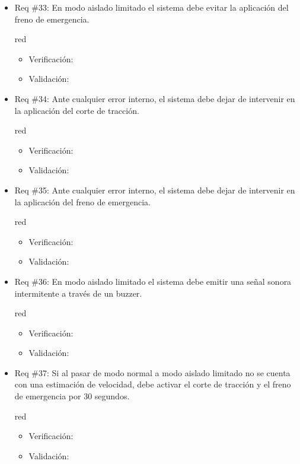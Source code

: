 \documentclass[11pt]{charter}
\begin{document}
\begin{itemize}
\item Req \#33: En modo aislado limitado el sistema debe evitar la aplicación del freno de emergencia.
\begin{consigna}{red}
\begin{itemize}
  \item Verificación:\\
  \item Validación:\\
\end{itemize}
\end{consigna}

\item Req \#34: Ante cualquier error interno, el sistema debe dejar de intervenir en la aplicación del corte de tracción.
\begin{consigna}{red}
\begin{itemize}
  \item Verificación:\\
  \item Validación:\\
\end{itemize}
\end{consigna}

\item Req \#35: Ante cualquier error interno, el sistema debe dejar de intervenir en la aplicación del freno de emergencia.
\begin{consigna}{red}
\begin{itemize}
  \item Verificación:\\
  \item Validación:\\
\end{itemize}
\end{consigna}

\item Req \#36: En modo aislado limitado el sistema debe emitir una señal sonora intermitente a través de un buzzer.
\begin{consigna}{red}
\begin{itemize}
  \item Verificación:\\
  \item Validación:\\
\end{itemize}
\end{consigna}

\item Req \#37: Si al pasar de modo normal a modo aislado limitado no se cuenta con una estimación de velocidad, debe activar el corte de tracción y el freno de emergencia por 30 segundos.
\begin{consigna}{red}
\begin{itemize}
  \item Verificación:\\
  \item Validación:\\
\end{itemize}
\end{consigna}


\end{itemize}
\end{document}
